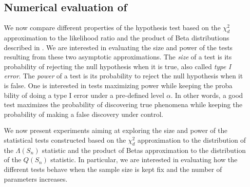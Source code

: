 \subsection{Numerical evaluation of }

\begin{figure}[!htbp]
    \centering
\end{figure}

\begin{figure}[!htbp]
    \centering
\end{figure}

\begin{figure}[!htbp]
    \centering
\end{figure}


We now compare different properties of the hypothesis test based on the $\chi^2_d$ approximation to the likelihood ratio and the product of Beta distributions described in . We are interested in evaluating the size and power of the tests resulting from these two asymptotic approximations. The \textit{size} of a test is its probability of rejecting the null hypothesis when it is true, also called \textit{type I error}. The \textit{power} of a test is its probability to reject the null hypothesis when it is false. One is interested in tests maximizing power while keeping the proba bility of doing a type I error under a pre-defined level $\alpha$. In other words, a good test maximizes the probability of discovering true phenomena while keeping the probability of making a false discovery under control. 

We now present experiments aiming at exploring the size and power of the statistical tests constructed based on the $\chi^2_d$ approximation to the distribution of the $\Lambda(S_n)$ statistic and the product of Betas approximation to the distribution of the $Q(S_n)$ statistic. In particular, we are interested in evaluating how the different tests behave when the sample size is kept fix and the number of parameters increases.

